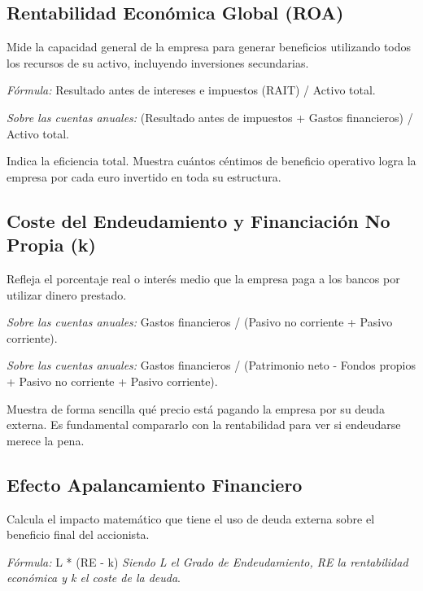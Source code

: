 \documentclass[12pt]{book} %
\begin{document}
\hypertarget{rentabilidad-econuxf3mica-global-roa}{%
\subsection{Rentabilidad Económica Global
(ROA)}\label{rentabilidad-econuxf3mica-global-roa}}

Mide la capacidad general de la empresa para generar beneficios
utilizando todos los recursos de su activo, incluyendo inversiones
secundarias.

\emph{Fórmula:} Resultado antes de intereses e impuestos (RAIT) / Activo
total.

\emph{Sobre las cuentas anuales:} (Resultado antes de impuestos + Gastos
financieros) / Activo total.

Indica la eficiencia total. Muestra cuántos céntimos de beneficio
operativo logra la empresa por cada euro invertido en toda su
estructura.

\hypertarget{coste-del-endeudamiento-y-financiaciuxf3n-no-propia-k}{%
\subsection{Coste del Endeudamiento y Financiación No Propia
(k)}\label{coste-del-endeudamiento-y-financiaciuxf3n-no-propia-k}}

Refleja el porcentaje real o interés medio que la empresa paga a los
bancos por utilizar dinero prestado.

\emph{Sobre las cuentas anuales:} Gastos financieros / (Pasivo no
corriente + Pasivo corriente).

\emph{Sobre las cuentas anuales:} Gastos financieros / (Patrimonio neto
- Fondos propios + Pasivo no corriente + Pasivo corriente).

Muestra de forma sencilla qué precio está pagando la empresa por su
deuda externa. Es fundamental compararlo con la rentabilidad para ver si
endeudarse merece la pena.

\hypertarget{efecto-apalancamiento-financiero}{%
\subsection{Efecto Apalancamiento
Financiero}\label{efecto-apalancamiento-financiero}}

Calcula el impacto matemático que tiene el uso de deuda externa sobre el
beneficio final del accionista.

\emph{Fórmula:} L * (RE - k) \emph{Siendo L el Grado de Endeudamiento,
RE la rentabilidad económica y k el coste de la deuda}.
\end{document}
